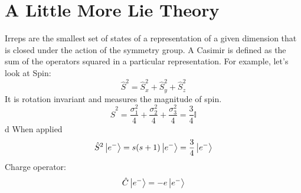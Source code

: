 \documentclass[]{article}
\begin{document}
\section{A Little More Lie Theory}
Irreps are the smallest set of states of a representation of a given dimension that is closed under the action of the symmetry group. A Casimir is defined as the sum of the operators squared in a particular representation. For example, let's look at Spin:
\begin{equation}
\hat{S}^{2} = \hat{S}_{x}^{2} + \hat{S}_{y}^{2} + \hat{S}_{z}^{2}
\end{equation}
It is rotation invariant and measures the magnitude of spin.
\begin{equation}
\hat{S}^{2} = \frac{\sigma^{2}_{1}}{4} + \frac{\sigma^{2}_{2}}{4} + \frac{\sigma^{2}_{3}}{4} = \frac{3}{4} \mathbb{I}
\end{equation}d
When applied 
\begin{equation}
\hat{S}^{2} \ket{e^{-}} = s(s+1) \ket{e^{-}} = \frac{3}{4} \ket{e^{-}}
\end{equation}
Charge operator:
\begin{equation}
\hat{C} \ket{e^{-}} = - e \ket{e^{-}}
\end{equation}
\end{document}
